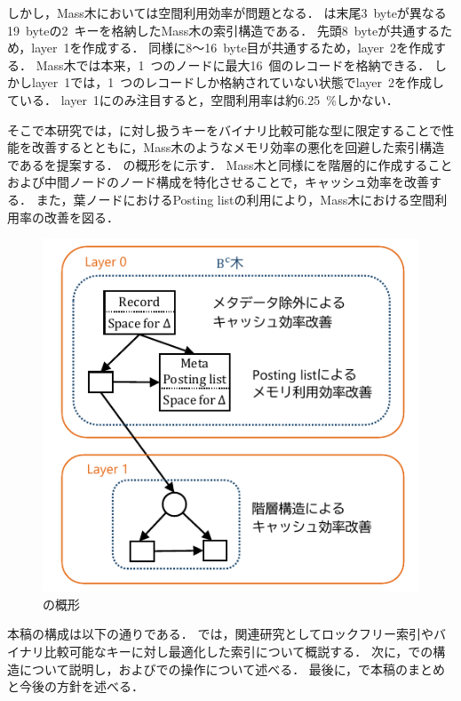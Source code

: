 しかし，Mass木においては空間利用効率が問題となる．
\Fig{\ref{fig:memory}}は末尾3~byteが異なる19~byteの2~キーを格納したMass木の索引構造である．
先頭8~byteが共通するため，layer~1を作成する．
同様に8～16~byte目が共通するため，layer~2を作成する．
Mass木では本来，1~つのノードに最大16~個のレコードを格納できる．
しかしlayer~1では，1~つのレコードしか格納されていない状態でlayer~2を作成している．
layer~1にのみ注目すると，空間利用率は約6.25~\%しかない．

そこで本研究では，\Bctree{}に対し扱うキーをバイナリ比較可能な型に限定することで性能を改善するとともに，Mass木のようなメモリ効率の悪化を回避した索引構造である\Bcforest{}を提案する．
\Bcforest{}の概形を\Fig{\ref{fig:bcforest}}に示す．
Mass木と同様に\Bctree{}を階層的に作成することおよび中間ノードのノード構成を特化させることで，キャッシュ効率を改善する．
また，葉ノードにおけるPosting listの利用により，Mass木における空間利用率の改善を図る．

\begin{figure}[t]
    \centering
    \includegraphics{./figures/bcforest.pdf}
    \caption{\Bcforest{}の概形}
    \label{fig:bcforest}
\end{figure}

本稿の構成は以下の通りである．
\Sec{\ref{sec:relatedwork}}では，関連研究としてロックフリー索引やバイナリ比較可能なキーに対し最適化した索引について概説する．
次に，\Sec{\ref{sec:bc_forest_structure}}で\Bcforest{}の構造について説明し，\Sec{\ref{sec:node_operation}}および\Sec{\ref{sec:smo}}で\Bcforest{}の操作について述べる．
最後に，\Sec{\ref{sec:conclusion}}で本稿のまとめと今後の方針を述べる．

